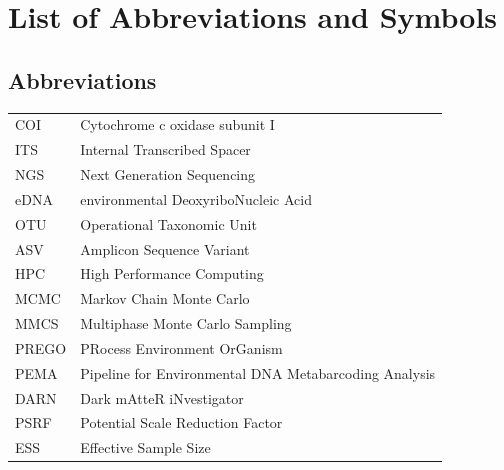 \documentclass[master=elt, cleveref, autoref, masteroption=eg]{kulemt}
\begin{document}
\listoffiguresandtables

\chapter{List of Abbreviations and Symbols}

\section*{Abbreviations}
   \begin{flushleft}
   \renewcommand{\arraystretch}{1.1}
   \begin{tabularx}{\textwidth}{@{}p{12mm}X@{}}
      COI   & Cytochrome c oxidase subunit I\\
      ITS   & Internal Transcribed Spacer\\
      NGS   & Next Generation Sequencing\\
      eDNA  & environmental DeoxyriboNucleic Acid\\
      OTU   & Operational Taxonomic Unit\\
      ASV   & Amplicon Sequence Variant\\
      HPC   & High Performance Computing\\
      MCMC  & Markov Chain Monte Carlo\\
      MMCS  & Multiphase Monte Carlo Sampling\\
      PREGO & PRocess Environment OrGanism\\
      PEMA  & Pipeline for Environmental DNA Metabarcoding Analysis\\
      DARN  & Dark mAtteR iNvestigator\\
      PSRF  & Potential Scale Reduction Factor\\
      ESS   & Effective Sample Size\\
   \end{tabularx}
\end{flushleft}


\end{document}
